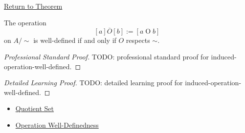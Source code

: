 \newpage
{}
\label{prf:induced-operation-well-defined}

\begin{remark*}[Return]
\hyperref[thm:induced-operation-well-defined]{Return to Theorem}
\end{remark*}

\begin{theorem*}
The operation
\[
[a]\mathbin{\overline{O}}[b]:=[a\mathbin{O}b]
\]
on $A/{\sim}$ is well-defined if and only if $O$ respects $\sim$.
\end{theorem*}

\begin{proof}[Professional Standard Proof]
\LRAProofBodyStart
TODO: professional standard proof for induced-operation-well-defined.
\end{proof}

\begin{proof}[Detailed Learning Proof]
\LRAProofBodyStart
TODO: detailed learning proof for induced-operation-well-defined.
\end{proof}

\begin{remark*}
\end{remark*}

\begin{dependencies}
\begin{itemize}
  \item \hyperref[def:quotient-set]{Quotient Set}
  \item \hyperref[def:operation-well-definedness]{Operation Well-Definedness}
\end{itemize}
\end{dependencies}

\clearpage
